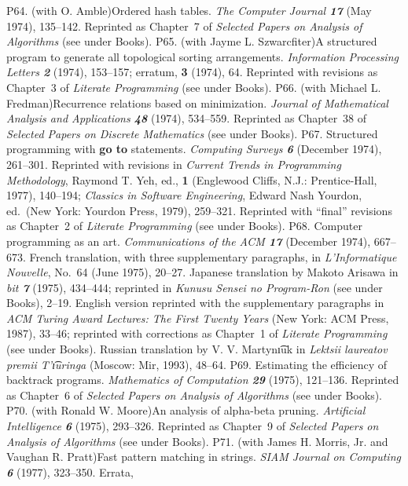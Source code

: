 \p P64.  (with O. Amble)\xskip  Ordered hash tables.
 {\sl The Computer Journal\/ \bf 17} (May 1974), 135--142.  
 Reprinted as Chapter~7 of {\sl Selected Papers on Analysis of Algorithms\/}
 (see under Books).
\p P65.  (with Jayme L. Szwarcfiter)\xskip  A structured program to
 generate all topological sorting arrangements.  {\sl Information
 Processing Letters\/ \bf 2} (1974), 153--157; erratum, {\bf3} (1974), 64.
 Reprinted with revisions
 as Chapter~3 of {\sl Literate Programming\/} (see under Books).
\p P66.  (with Michael L. Fredman)\xskip  Recurrence relations based
 on minimization.  {\sl Journal of Mathematical Analysis and Applications\/
 \bf 48} (1974), 534--559.  
 Reprinted as Chapter~38 of {\sl Selected Papers on
 Discrete Mathematics\/} (see under Books).
\p P67.  Structured programming with {\bf go to} statements. 
 {\sl Computing Surveys\/ \bf 6} (December 1974), 261--301.  Reprinted
 with revisions in {\sl Current Trends in Programming Methodology},
 Raymond T. Yeh, ed., {\bf 1} (Englewood Cliffs, N.J.:  Prentice-Hall,
 1977), 140--194; {\sl Classics in Software Engineering}, Edward Nash
 Yourdon, ed.\ (New York: Yourdon Press, 1979), 259--321. Reprinted with
 ``final'' revisions as Chapter~2 of {\sl Literate Programming\/}
 (see under Books).
\p P68.  Computer programming as an art.  {\sl Communications of the ACM\/
 \bf 17} (December 1974), 667--673.  French translation, with three
 supplementary paragraphs, in {\sl L'Informatique Nouvelle}, No.\ 64
 (June 1975), 20--27.  Japanese translation by Makoto Arisawa
 in {\sl bit\/ \bf 7} (1975), 434--444; reprinted in
 {\sl Kunusu Sensei no Program-Ron\/} (see under Books), 2--19.
 English version reprinted
 with the supplementary paragraphs in {\sl ACM Turing Award
 Lectures: The First Twenty Years} (New York: ACM Press, 1987), 33--46;
 reprinted with corrections as Chapter~1 of {\sl Literate Programming\/} (see
 under Books).
 Russian translation by V. V. Martyn\t{\i}uk in {\sl Lektsii laureatov
 premii T'\t{\i}uringa\/} (Moscow: Mir, 1993), 48--64.
\p P69.  Estimating the efficiency of backtrack programs.
 {\sl Mathematics of Compu\-ta\-tion\/ \bf 29} (1975), 121--136.  
 Reprinted as Chapter~6 of {\sl Selected Papers on Analysis of Algorithms\/}
 (see under Books).
\p P70.  (with Ronald W. Moore)\xskip An analysis of alpha-beta pruning. 
 {\sl Artificial Intelligence\/ \bf 6} (1975), 293--326.  
 Reprinted as Chapter~9 of {\sl Selected Papers on Analysis of Algorithms\/}
 (see under Books).
\p P71.  (with James H. Morris, Jr.  and Vaughan R. Pratt)\xskip  Fast pattern
 matching in 
 strings.  {\sl SIAM Journal on Computing\/ \bf 6} (1977), 323--350. Errata,
